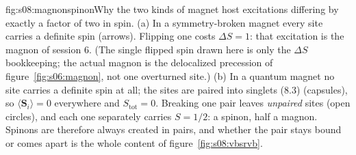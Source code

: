 %
\begin{aqmfigure}{fig:s08:magnonspinon}{Why the two kinds of magnet host excitations differing by
exactly a factor of two in spin. (a) In a symmetry-broken magnet every site carries a definite spin
(arrows). Flipping one costs $\Delta S=1$: that excitation is the magnon of session 6. (The single flipped
spin drawn here is only the $\Delta S$ bookkeeping; the actual magnon is the delocalized precession
of figure~\ref{fig:s06:magnon}, not one overturned site.) (b) In a
quantum magnet no site carries a definite spin at all; the sites are paired into singlets (8.3)
(capsules), so $\langle\mathbf S_i\rangle=0$ everywhere and $S_\text{tot}=0$. Breaking one pair
leaves \emph{unpaired} sites (open circles), and each one separately carries $S=1/2$: a spinon,
half a magnon. Spinons are therefore always created in pairs, and whether the pair stays bound or
comes apart is the whole content of figure~\ref{fig:s08:vbsrvb}.}

\end{aqmfigure}
